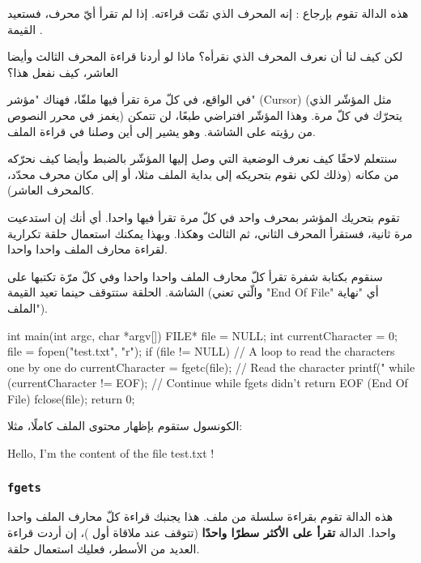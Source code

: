 هذه الدالة تقوم بإرجاع
:
إنه المحرف الذي تمّت قراءته.
إذا لم تقرأ أيّ محرف، فستعيد القيمة
.

\begin{question}
لكن كيف لنا أن نعرف المحرف الذي نقرأه؟ ماذا لو أردنا قراءة المحرف الثالث وأيضا العاشر، كيف نفعل هذا؟
\end{question}

في الواقع، في كلّ مرة تقرأ فيها ملفّا، فهناك "مؤشر"
(\textenglish{Cursor})
(مثل المؤشّر الذي يغمز في محرر النصوص) يتحرّك في كلّ مرة. وهذا المؤشّر افتراضي طبعًا، لن تتمكن من رؤيته على الشاشة. وهو يشير إلى أين وصلنا في قراءة الملف.

سنتعلم لاحقًا كيف نعرف الوضعية التي وصل إليها المؤشّر بالضبط وأيضا كيف نحرّكه من مكانه (وذلك لكي نقوم بتحريكه إلى بداية الملف مثلا، أو إلى مكان محرف محدّد، كالمحرف العاشر).

تقوم بتحريك المؤشر بمحرف واحد في كلّ مرة تقرأ فيها واحدا. أي أنك إن استدعيت
مرة ثانية، فستقرأ المحرف الثاني، ثم الثالث وهكذا. وبهذا يمكنك استعمال حلقة تكرارية لقراءة محارف الملف واحدا واحدا.

سنقوم بكتابة شفرة تقرأ كلّ محارف الملف واحدا واحدا وفي كلّ مرّة تكتبها على الشاشة. الحلقة ستتوقف حينما تعيد
القيمة
(والّتي تعني
"\textenglish{End Of File}"
أي "نهاية الملف").

\begin{Csource}
int main(int argc, char *argv[])
{
	FILE* file = NULL;
	int currentCharacter = 0;
	file = fopen("test.txt", "r");
	if (file != NULL)
	{
  		// A loop to read the characters one by one
  		do
  		{
    			currentCharacter = fgetc(file); // Read the character
    			printf("%
  		} while (currentCharacter != EOF); // Continue while fgets didn't return EOF (End Of File)
  		fclose(file);
	}
	return 0;
}
\end{Csource}

الكونسول ستقوم بإظهار محتوى الملف كاملًا، مثلا:

\begin{Console}
Hello, I'm the content of the file test.txt !
\end{Console}

\subsubsection{\texttt{fgets}}

هذه الدالة تقوم بقراءة سلسلة من ملف. هذا يجنبك قراءة كلّ محارف الملف واحدا واحدا. الدالة
\textbf{تقرأ على الأكثر سطرًا واحدًا}
(تتوقف عند ملاقاة أول
)،
إن أردت قراءة العديد من الأسطر، فعليك استعمال حلقة.

